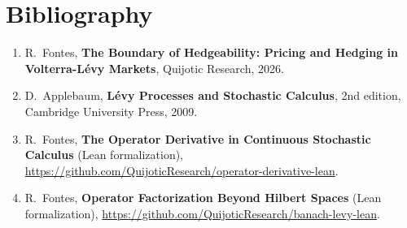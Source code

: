 \chapter*{Bibliography}

\begin{enumerate}

\item\label{bib:fontes2026}
R.~Fontes,
\textbf{The Boundary of Hedgeability: Pricing and Hedging in Volterra-L\'evy Markets},
Quijotic Research, 2026.

\item\label{bib:applebaum2009}
D.~Applebaum,
\textbf{L\'evy Processes and Stochastic Calculus},
2nd edition, Cambridge University Press, 2009.

\item\label{bib:operatorderivative}
R.~Fontes,
\textbf{The Operator Derivative in Continuous Stochastic Calculus} (Lean formalization),
\url{https://github.com/QuijoticResearch/operator-derivative-lean}.

\item\label{bib:banachlevy}
R.~Fontes,
\textbf{Operator Factorization Beyond Hilbert Spaces} (Lean formalization),
\url{https://github.com/QuijoticResearch/banach-levy-lean}.

\end{enumerate}
